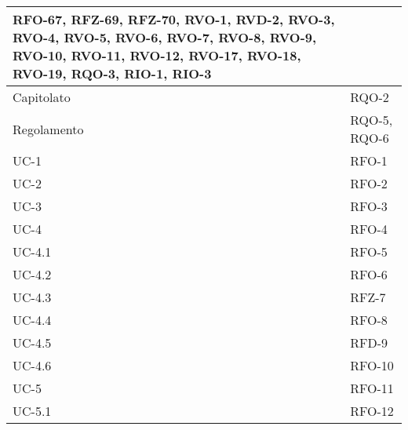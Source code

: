 \begin{xltabular}{\textwidth}{|X| X |}
                RFO-67, \newline
                RFZ-69, \newline
                RFZ-70, \newline
                RVO-1, \newline 
                RVD-2, \newline
                RVO-3, \newline
                RVO-4, \newline
                RVO-5, \newline
                RVO-6, \newline
                RVO-7, \newline
                RVO-8, \newline
                RVO-9, \newline
                RVO-10, \newline
                RVO-11, \newline
                RVO-12, \newline
                RVO-17, \newline
                RVO-18, \newline
                RVO-19, \newline
                RQO-3, \newline
                RIO-1, \newline
                RIO-3 \\
    \hline
    Capitolato & RQO-2 \\
    \hline
    Regolamento & RQO-5, \newline 
                 RQO-6 \\
    \hline
    UC-1 & RFO-1  \\
    \hline
    UC-2 & RFO-2  \\
    \hline
    UC-3 & RFO-3  \\
    \hline
    UC-4 & RFO-4 \\
    \hline
    UC-4.1 & RFO-5\\
    \hline
    UC-4.2 & RFO-6\\
    \hline
    UC-4.3 & RFZ-7 \\
    \hline
    UC-4.4 & RFO-8\\ 
    \hline
    UC-4.5 & RFD-9\\
    \hline
    UC-4.6 & RFO-10\\
    \hline
    UC-5 & RFO-11\\
    \hline
    UC-5.1 & RFO-12\\

\end{xltabular}

